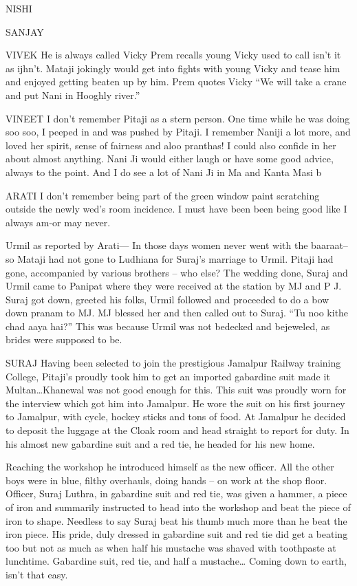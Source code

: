 NISHI

SANJAY 

VIVEK
He is always called Vicky
Prem recalls young Vicky used to call isn’t it as ijhn’t. 
Mataji jokingly would get into fights with young Vicky and tease him and enjoyed getting beaten up by him. Prem quotes Vicky “We will take a crane and put Nani in Hooghly river.” 

VINEET
I don’t remember Pitaji as a stern person. One time while he was doing soo soo, I peeped in and was pushed by Pitaji. 
I remember Naniji a lot more, and loved her spirit, sense of fairness and aloo pranthas! I could also confide in her about almost anything. Nani Ji would either laugh or have some good advice, always to the point. And I do see a lot of Nani Ji in Ma and Kanta Masi b


ARATI
I don’t remember being part of the green window paint scratching outside the newly wed’s room incidence. I must have been been being good like I always am-or may never. 

Urmil as reported by Arati— In those days women never went with the baaraat– so Mataji had not gone to Ludhiana for Suraj’s marriage to Urmil. Pitaji had gone, accompanied by various brothers – who else? The wedding done, Suraj and Urmil came to Panipat where they were received at the station by MJ and 
P J. Suraj got down, greeted his folks, Urmil followed and proceeded to do a bow down pranam to MJ. MJ blessed her and then called out to Suraj. “Tu noo kithe chad aaya hai?” This was because Urmil was not bedecked and bejeweled, as brides were supposed to be.

SURAJ
Having been selected to join the prestigious Jamalpur Railway training College, Pitaji’s proudly took him to get an imported gabardine suit made it Multan…Khanewal was not good enough for this. This suit was proudly worn for the interview which got him into Jamalpur. He wore the suit on his first journey to Jamalpur, with cycle, hockey sticks and tons of food.
At Jamalpur he decided to deposit the luggage at the Cloak room and head straight to report for duty. In his almost new gabardine suit and a red tie, he headed for his new home.

Reaching the workshop he introduced himself as the new officer. All the other boys were in blue, filthy overhauls, doing hands – on work at the shop floor. Officer, Suraj Luthra, in gabardine suit and red tie, was given a hammer, a piece of iron and summarily instructed to head into the workshop and beat the piece of iron to shape. Needless to say Suraj beat his thumb much more than he beat the iron piece. His pride, duly dressed in gabardine suit and red tie did get a beating too but not as much as when half his mustache was shaved with toothpaste at lunchtime. Gabardine suit, red tie, and half a mustache… Coming down to earth, isn’t that easy.


